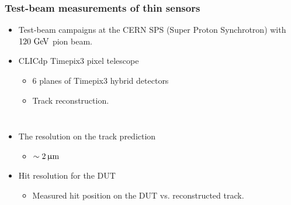 \begin{frame}
  \frametitle{Test-beam measurements of thin sensors}

  \begin{itemize}
  \item Test-beam campaigns at the CERN SPS (Super Proton Synchrotron)
    with $120\,\mathrm{\,Ge\kern -0.1em V}$ pion beam.
  \item CLICdp Timepix3 pixel telescope
    \begin{itemize}
    \item 6 planes of Timepix3 hybrid detectors
    \item Track reconstruction.
    \end{itemize}
  \end{itemize}


  \begin{columns}

    
    \begin{itemize}
    \item The resolution on the track prediction
      \begin{itemize}
      \item \textcolor{Green}{$\sim2\,\upmu\mathrm{m}$}
      \end{itemize}
    \item Hit resolution for the DUT
      \begin{itemize}
      \item Measured hit position on the DUT
        vs. reconstructed track.
      \end{itemize}
    \end{itemize}


\end{columns}
\end{frame}
